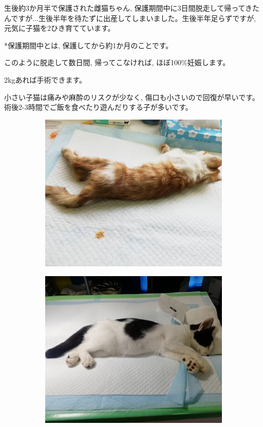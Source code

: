 \documentclass{jsarticle}
\begin{document}
\Large
  生後約3か月半で保護された雌猫ちゃん, 保護期間中に3日間脱走して帰ってきたんですが...生後半年を待たずに出産してしまいました。生後半年足らずですが, 元気に子猫を2ひき育てています。

  *保護期間中とは, 保護してから約1か月のことです。

このように脱走して数日間, 帰ってこなければ, ほぼ100\%妊娠します。

	\huge
	  2\si{\kilogram}あれば手術できます。

	\Large
	  小さい子猫は痛みや麻酔のリスクが少なく, 傷口も小さいので回復が早いです。術後2-3時間でご飯を食べたり遊んだりする子が多いです。

		\begin{figure}[htbp]
			\centering
			\begin{subfigure}{0.4\columnwidth}
				\centering
				\includegraphics[width=\columnwidth]{3.jpg}
			\end{subfigure}
			\begin{subfigure}{0.4\columnwidth}
				\centering
				\includegraphics[width=\columnwidth]{4.jpg}
			\end{subfigure}
		\end{figure}
\end{document}
